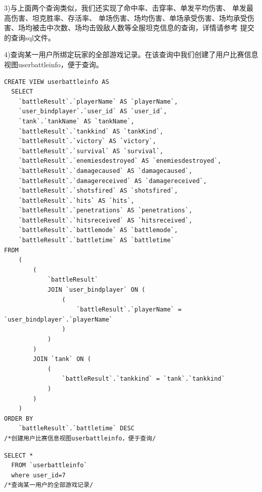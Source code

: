 \documentclass[UTF8, a4paper]{ctexart}
\begin{document}
3)与上面两个查询类似，我们还实现了命中率、击穿率、单发平均伤害、 单发最高伤害、坦克胜率、存活率、 
单场伤害、场均伤害、单场承受伤害、场均承受伤害、场均被击中次数、场均击毁敌人数等全服坦克信息的查询，详情请参考
提交的查询sql文件。

4)查询某一用户所绑定玩家的全部游戏记录。在该查询中我们创建了用户比赛信息视图userbattleinfo，便于查询。
\begin{lstlisting}[style=A]
  CREATE VIEW userbattleinfo AS
  SELECT
	`battleResult`.`playerName` AS `playerName`,
	`user_bindplayer`.`user_id` AS `user_id`,
	`tank`.`tankName` AS `tankName`,
	`battleResult`.`tankkind` AS `tankKind`,
	`battleResult`.`victory` AS `victory`,
	`battleResult`.`survival` AS `survival`,
	`battleResult`.`enemiesdestroyed` AS `enemiesdestroyed`,
	`battleResult`.`damagecaused` AS `damagecaused`,
	`battleResult`.`damagereceived` AS `damagereceived`,
	`battleResult`.`shotsfired` AS `shotsfired`,
	`battleResult`.`hits` AS `hits`,
	`battleResult`.`penetrations` AS `penetrations`,
	`battleResult`.`hitsreceived` AS `hitsreceived`,
	`battleResult`.`battlemode` AS `battlemode`,
	`battleResult`.`battletime` AS `battletime`
FROM
	(
		(
			`battleResult`
			JOIN `user_bindplayer` ON (
				(
					`battleResult`.`playerName` = `user_bindplayer`.`playerName`
				)
			)
		)
		JOIN `tank` ON (
			(
				`battleResult`.`tankkind` = `tank`.`tankkind`
			)
		)
	)
ORDER BY
	`battleResult`.`battletime` DESC
/*创建用户比赛信息视图userbattleinfo，便于查询/
\end{lstlisting}

\begin{lstlisting}[style=A]
  SELECT *
  FROM `userbattleinfo`
  where user_id=7
/*查询某一用户的全部游戏记录/
\end{lstlisting}
\end{document}
